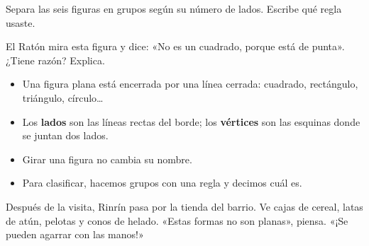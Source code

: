 \documentclass[11pt]{article}
\begin{document}
\begin{preguntas}
\pregunta Separa las seis figuras en grupos según su número de lados.
Escribe qué regla usaste.
\begin{center}
\end{center}

\pregunta El Ratón mira esta figura y dice: «No es un cuadrado, porque está
de punta». ¿Tiene razón? Explica.
\begin{center}
\end{center}
\end{preguntas}

\begin{resumen}
\begin{itemize}
  \item Una figura plana está encerrada por una línea cerrada: cuadrado,
        rectángulo, triángulo, círculo\ldots
  \item Los \textbf{lados} son las líneas rectas del borde; los
        \textbf{vértices} son las esquinas donde se juntan dos lados.
  \item Girar una figura no cambia su nombre.
  \item Para clasificar, hacemos grupos con una regla y decimos cuál es.
\end{itemize}
\end{resumen}

\label{tema:cuerpos}

\begin{hilo}
Después de la visita, Rinrín pasa por la tienda del barrio. Ve cajas de
cereal, latas de atún, pelotas y conos de helado. «Estas formas no son
planas», piensa. «¡Se pueden agarrar con las manos!»
\end{hilo}
\end{document}
